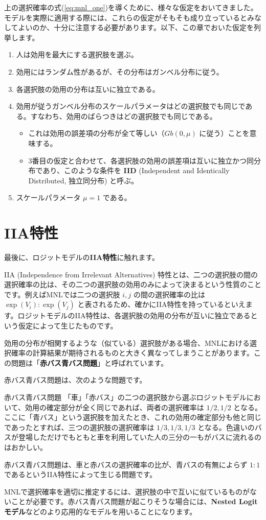 上の選択確率の式(\ref{eq:mnl_one})を導くために、様々な仮定をおいてきました。モデルを実際に適用する際には、これらの仮定がそもそも成り立っているとみなしてよいのか、十分に注意する必要があります。以下、この章でおいた仮定を列挙します。

\begin{enumerate}
    \item 人は効用を最大にする選択肢を選ぶ。
    \item 効用にはランダム性があるが、その分布はガンベル分布に従う。
    \item 各選択肢の効用の分布は互いに独立である。
    \item 効用が従うガンベル分布のスケールパラメータはどの選択肢でも同じである。すなわち、効用のばらつきはどの選択肢でも同じである。
          \begin{itemize}
              \item これは効用の誤差項の分布が全て等しい（$Gb(0,\mu)$ に従う）ことを意味する。
              \item 3番目の仮定と合わせて、各選択肢の効用の誤差項は互いに独立かつ同分布であり、このような条件を \textbf{IID} (Independent and Identically Distributed, 独立同分布) と呼ぶ。
          \end{itemize}
    \item スケールパラメータ $\mu=1$ である。
\end{enumerate}

\section{IIA特性}\label{sec:iia}

最後に、ロジットモデルの\textbf{IIA特性}に触れます。

IIA (Independence from Irrelevant Alternatives) 特性とは、二つの選択肢の間の選択確率の比は、その二つの選択肢の効用のみによって決まるという性質のことです。例えばMNLでは二つの選択肢 $i, j$ の間の選択確率の比は $\exp(V_i):\exp(V_j)$ と表されるため、確かにIIA特性を持っているといえます。ロジットモデルのIIA特性は、各選択肢の効用の分布が互いに独立であるという仮定によって生じたものです。

効用の分布が相関するような（似ている）選択肢がある場合、MNLにおける選択確率の計算結果が期待されるものと大きく異なってしまうことがあります。この問題は「\textbf{赤バス青バス問題}」と呼ばれています。

赤バス青バス問題は、次のような問題です。

\begin{itembox}[l]{赤バス青バス問題}
    「車」「赤バス」の二つの選択肢から選ぶロジットモデルにおいて、効用の確定部分が全く同じであれば、両者の選択確率は $1/2, 1/2$ となる。ここに「青バス」という選択肢を加えたとき、これの効用の確定部分も他と同じであったとすれば、三つの選択肢の選択確率は $1/3, 1/3, 1/3$ となる。色違いのバスが登場しただけでもともと車を利用していた人の三分の一もがバスに流れるのはおかしい。
\end{itembox}

赤バス青バス問題は、車と赤バスの選択確率の比が、青バスの有無によらず $1:1$ であるというIIA特性によって生じる問題です。

MNLで選択確率を適切に推定するには、選択肢の中で互いに似ているものがないことが必要です。赤バス青バス問題が起こりそうな場合には、\textbf{Nested Logit モデル}などのより応用的なモデルを用いることになります。
